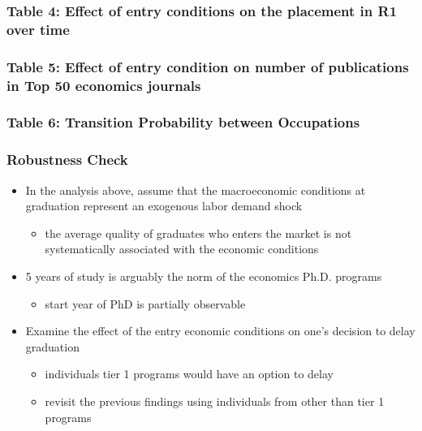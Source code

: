 \documentclass[10pt,svgnames,fragile]{beamer}
\begin{document}
{
\begin{frame}
	\frametitle{Table 4: Effect of entry conditions on the placement in R1  over time}
	
\end{frame}}

%	

{
\begin{frame}
	\frametitle{Table 5: Effect of entry condition on  number of publications in Top 50 economics journals}
	
\end{frame}}

\begin{frame}
	\frametitle{Table 6: Transition Probability between Occupations}
	
\end{frame}


%	




\begin{frame}[label = robustness]
	\frametitle{Robustness Check}
	\begin{itemize}
		\item In the analysis above,  assume that the macroeconomic conditions at graduation represent an exogenous labor demand shock
		\begin{itemize}
			\vspace{1 mm}
			\item  the average quality of graduates who enters the market is not systematically associated with the economic conditions
		\end{itemize}
\vfill
		\item 5 years of study is arguably the norm of the economics Ph.D. programs	
		\begin{itemize}
			\vspace{1 mm}
			\item start year of PhD is partially observable
		\end{itemize}
\vfill
		\item Examine the effect of the entry economic conditions on one's decision to delay graduation %
		\begin{itemize}
			\vspace{1 mm}
			\item individuals tier 1 programs would have an option to delay 
			\vspace{1 mm}
			\item revisit the previous findings using individuals from other than tier 1 programs %
		\end{itemize}
\vfill
	\end{itemize}
\end{frame}
\end{document}
